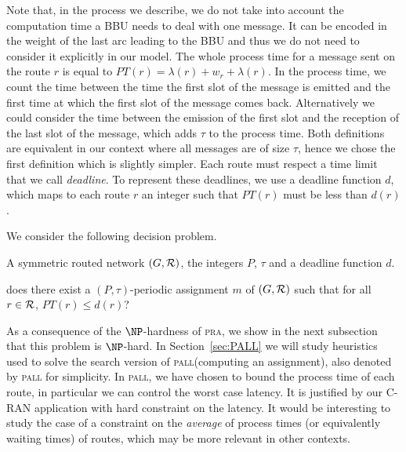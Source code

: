 \documentclass[10pt, conference, letterpaper]{IEEEtran}
\newcommand\pall{\textsc{pall}\xspace}
\newcommand\pra{\textsc{pra}\xspace}
\begin{document}
      Note that, in the process we describe, we do not take into account the computation time a BBU needs to deal with one message. It can be encoded in the weight of the last arc leading to the BBU and thus we do not need to consider it explicitly in our model. 
      The whole process time for a message sent on the route $r$ is equal to $PT(r)=\lambda(r)+ w_r+\lambda(r)$.      
      In the process time, we count the time between the time the first slot of the message is emitted and the first time at which the first slot of the message comes back. Alternatively we could consider the time between the emission of the first slot and the reception of the last slot of the message, which adds $\tau$ to the process time. Both definitions are equivalent in our context where all messages are of size $\tau$, hence we chose the first definition which is slightly simpler. 
      Each route must respect a time limit that we call \emph{deadline}. To represent these deadlines, 
      we use a deadline function $d$, which maps to each route $r$ an integer such that $PT(r)$ must be less than $d(r)$.
      
      We consider the following decision problem.

      \noindent {\bf Periodic Assignment for Low Latency (\pall)} 

        A symmetric routed network $(G,{\cal R})$, the integers $P$, $\tau$ and a deadline function $d$.
      
       does there exist a $(P,\tau)$-periodic assignment $m$ of $(G,{\cal R})$ such that for all $r \in {\cal R}$, $PT(r) \leq d(r)$?

      As a consequence of the $\NP$-hardness of \pra, we show in the next subsection that this problem is $\NP$-hard. 
      In Section~\ref{sec:PALL} we will study heuristics used to solve the search version of \pall (computing an assignment), also denoted by \pall for simplicity. In \pall, we have chosen to bound the process time of each route, in particular we can control the worst case latency. It is justified by our C-RAN application with hard constraint on the latency. It would be interesting to study the case of a constraint on the \emph{average} of process times (or equivalently waiting times) of routes, which may be more relevant in other contexts.
\end{document}
